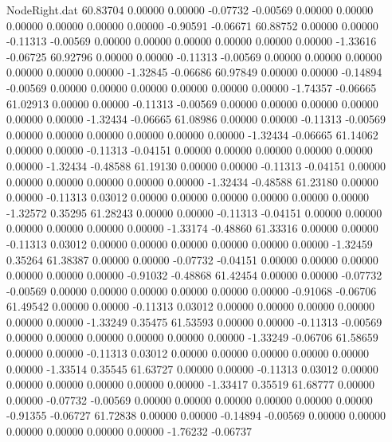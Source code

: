 \begin{filecontents}{NodeRight.dat}
  60.83704    0.00000    0.00000    -0.07732   -0.00569    0.00000    0.00000    0.00000    0.00000    0.00000    0.00000   -0.90591   -0.06671
  60.88752    0.00000    0.00000    -0.11313   -0.00569    0.00000    0.00000    0.00000    0.00000    0.00000    0.00000   -1.33616   -0.06725
  60.92796    0.00000    0.00000    -0.11313   -0.00569    0.00000    0.00000    0.00000    0.00000    0.00000    0.00000   -1.32845   -0.06686
  60.97849    0.00000    0.00000    -0.14894   -0.00569    0.00000    0.00000    0.00000    0.00000    0.00000    0.00000   -1.74357   -0.06665
  61.02913    0.00000    0.00000    -0.11313   -0.00569    0.00000    0.00000    0.00000    0.00000    0.00000    0.00000   -1.32434   -0.06665
  61.08986    0.00000    0.00000    -0.11313   -0.00569    0.00000    0.00000    0.00000    0.00000    0.00000    0.00000   -1.32434   -0.06665
  61.14062    0.00000    0.00000    -0.11313   -0.04151    0.00000    0.00000    0.00000    0.00000    0.00000    0.00000   -1.32434   -0.48588
  61.19130    0.00000    0.00000    -0.11313   -0.04151    0.00000    0.00000    0.00000    0.00000    0.00000    0.00000   -1.32434   -0.48588
  61.23180    0.00000    0.00000    -0.11313    0.03012    0.00000    0.00000    0.00000    0.00000    0.00000    0.00000   -1.32572    0.35295
  61.28243    0.00000    0.00000    -0.11313   -0.04151    0.00000    0.00000    0.00000    0.00000    0.00000    0.00000   -1.33174   -0.48860
  61.33316    0.00000    0.00000    -0.11313    0.03012    0.00000    0.00000    0.00000    0.00000    0.00000    0.00000   -1.32459    0.35264
  61.38387    0.00000    0.00000    -0.07732   -0.04151    0.00000    0.00000    0.00000    0.00000    0.00000    0.00000   -0.91032   -0.48868
  61.42454    0.00000    0.00000    -0.07732   -0.00569    0.00000    0.00000    0.00000    0.00000    0.00000    0.00000   -0.91068   -0.06706
  61.49542    0.00000    0.00000    -0.11313    0.03012    0.00000    0.00000    0.00000    0.00000    0.00000    0.00000   -1.33249    0.35475
  61.53593    0.00000    0.00000    -0.11313   -0.00569    0.00000    0.00000    0.00000    0.00000    0.00000    0.00000   -1.33249   -0.06706
  61.58659    0.00000    0.00000    -0.11313    0.03012    0.00000    0.00000    0.00000    0.00000    0.00000    0.00000   -1.33514    0.35545
  61.63727    0.00000    0.00000    -0.11313    0.03012    0.00000    0.00000    0.00000    0.00000    0.00000    0.00000   -1.33417    0.35519
  61.68777    0.00000    0.00000    -0.07732   -0.00569    0.00000    0.00000    0.00000    0.00000    0.00000    0.00000   -0.91355   -0.06727
  61.72838    0.00000    0.00000    -0.14894   -0.00569    0.00000    0.00000    0.00000    0.00000    0.00000    0.00000   -1.76232   -0.06737

\end{filecontents}
